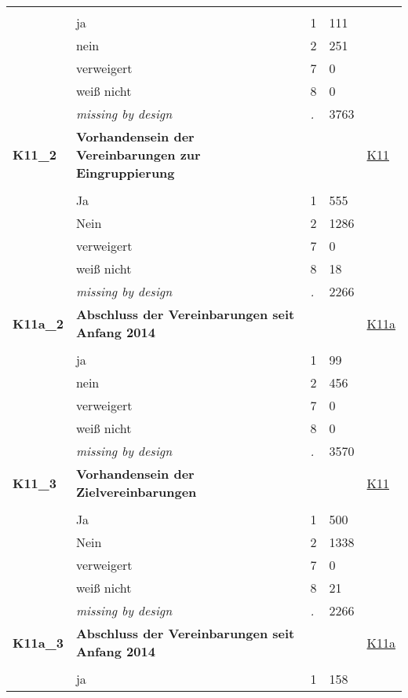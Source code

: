 \begin{longtable}{| L{2.65cm} | L{8cm} | C{1.5cm} | R{1.25cm} | C{2.25cm}  |}
   &  &  &  &  \\ 
   & ja & 1 & 111 &  \\ 
   & nein & 2 & 251 &  \\ 
   & verweigert & 7 & 0 &  \\ 
   & weiß nicht & 8 & 0 &  \\ 
   & \textit{missing by design} & \textit{.} & 3763 &  \\ 
   \midrule
\textbf{K11\_2}\label{var:K11:2} & \textbf{Vorhandensein der Vereinbarungen zur Eingruppierung} &  &  & \hyperref[K11]{K11} \\ 
   &  &  &  &  \\ 
   & Ja & 1 & 555 &  \\ 
   & Nein & 2 & 1286 &  \\ 
   & verweigert & 7 & 0 &  \\ 
   & weiß nicht & 8 & 18 &  \\ 
   & \textit{missing by design} & \textit{.} & 2266 &  \\ 
   \midrule
\textbf{K11a\_2}\label{var:K11a:2} & \textbf{Abschluss der Vereinbarungen seit Anfang 2014} &  &  & \hyperref[K11a]{K11a} \\ 
   &  &  &  &  \\ 
   & ja & 1 & 99 &  \\ 
   & nein & 2 & 456 &  \\ 
   & verweigert & 7 & 0 &  \\ 
   & weiß nicht & 8 & 0 &  \\ 
   & \textit{missing by design} & \textit{.} & 3570 &  \\ 
   \midrule
\textbf{K11\_3}\label{var:K11:3} & \textbf{Vorhandensein der Zielvereinbarungen} &  &  & \hyperref[K11]{K11} \\ 
   &  &  &  &  \\ 
   & Ja & 1 & 500 &  \\ 
   & Nein & 2 & 1338 &  \\ 
   & verweigert & 7 & 0 &  \\ 
   & weiß nicht & 8 & 21 &  \\ 
   & \textit{missing by design} & \textit{.} & 2266 &  \\ 
   \midrule
\textbf{K11a\_3}\label{var:K11a:3} & \textbf{Abschluss der Vereinbarungen seit Anfang 2014} &  &  & \hyperref[K11a]{K11a} \\ 
   &  &  &  &  \\ 
   & ja & 1 & 158 &  \\ 

\end{longtable}
